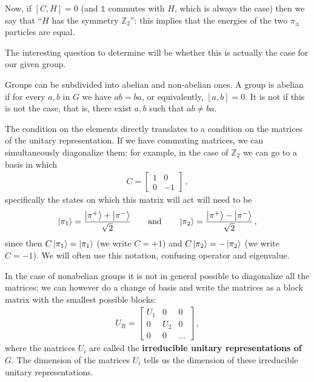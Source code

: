 \documentclass[main.tex]{subfiles}
\begin{document}
Now, if \([C, H] =0\) (and \(\mathbb{1}\) commutes with \(H\), which is always the case) then we say that ``\(H\) has the symmetry \(\mathbb{Z}_{2}\)'': this implies that the energies of the two \(\pi_{\pm}\) particles are equal.

The interesting question to determine will be whether this is actually the case for our given group. 

Groups can be subdivided into abelian and non-abelian ones.
A group is abelian if for every \(a, b\) in \(G\) we have \(ab = ba\), or equivalently, \([a, b] =0\). 
It is not if this is not the case, that is, there exist \(a, b\) such that \(ab \neq ba\).

The condition on the elements directly translates to a condition on the matrices of the unitary representation. 
If we have commuting matrices, we can simultaneously diagonalize them: for example, in the case of \(\mathbb{Z}_{2}\) we can go to a basis in which 
%
\begin{subequations}
\begin{align}
C = \left[\begin{array}{cc}
1 & 0 \\ 
0 & -1
\end{array}\right]
\,,
\end{align}
\end{subequations}
%
specifically the states on which this matrix will act will need to be 
%
\begin{align}
\ket{\pi_{1}} = \frac{\ket{\pi^{+}} + \ket{\pi^{-}}}{\sqrt{2}} 
\qquad \text{and} \qquad
\ket{\pi_{2}} = \frac{\ket{\pi^{+}} - \ket{\pi^{-}}}{\sqrt{2}}
\,,
\end{align}
%
since then \(C \ket{\pi_1 } = \ket{\pi_1 }\) (we write \(C = +1\)) and \(C \ket{\pi_{2}} = - \ket{\pi_2 }\) (we write \(C = -1\)). 
We will often use this notation, confusing operator and eigenvalue.

In the case of nonabelian groups it is not in general possible to diagonalize all the matrices; we can however do a change of basis and write the matrices as a block matrix with the smallest possible blocks:
%
\begin{subequations}
\begin{align}
U_{R} = \left[\begin{array}{ccc}
U_1  & 0 & 0 \\ 
0 & U_2  & 0 \\ 
0 & 0 & \dots
\end{array}\right] 
\,,
\end{align}
\end{subequations}
%
where the matrices \(U_i\) are called the \textbf{irreducible unitary representations of \(G\)}.
The dimension of the matrices \(U_i\) tells us the dimension of these irreducible unitary representations.
\end{document}
